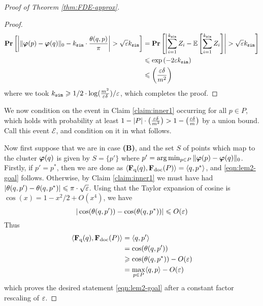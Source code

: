 \begin{proof}[Proof of Theorem \ref{thm:FDE-approx}]
\begin{proof}
\begin{equation}
    \begin{split}
        \operatorname{{\bf Pr}}\left[ \left| \|\boldsymbol{\varphi}(p) - \boldsymbol{\varphi}(q)\|_0 -  k_{\texttt{sim}} \cdot \frac{\theta(q,p)}{\pi} \right|  >  \sqrt{\varepsilon} k_{\texttt{sim}} \right] &=  \operatorname{{\bf Pr}}\left[ \left| \sum_{i=1}^{k_{\texttt{sim}}} Z_i -  \mathop{ \mathbb{E}\left[ \sum_{i=1}^{k_{\texttt{sim}}} Z_i \right]}\right|  >  \sqrt{\varepsilon} k_{\texttt{sim}} \right]  \\
        & \leqslant \exp\left(-2\varepsilon k_{\texttt{sim}}\right)\\
        & \leqslant    \left(\frac{\varepsilon\delta }{m^2}\right)
    \end{split}
\end{equation}
where we took $k_{\texttt{sim}} \geqslant 1/2 \cdot \log(\frac{m^2}{\varepsilon \delta})/\varepsilon$, which completes the proof.
\end{proof}
We now condition on the event in Claim \ref{claim:inner1} occurring for all $p \in P$, which holds with probability at least $1- |P|\cdot \left(\frac{\varepsilon\delta }{m^2}\right) > 1-  \left(\frac{\varepsilon\delta }{m}\right)$ by a union bound. Call this event $\mathcal{E}$, and condition on it in what follows.


Now first suppose that we are in case \textbf{(B)}, and the set $S$ of points which map to the cluster $\boldsymbol{\varphi}(q)$ is given by $S = \{p'\}$ where $p' = \arg \min_{p \in P} \|\boldsymbol{\varphi}(p) - \boldsymbol{\varphi}(q)\|_0$. Firstly, if $p' = p^*$, then we are done as $\langle \mathbf{F}_{\text{q}}(q) , \mathbf{F}_{\text{doc}}(P)\rangle = \langle q,p^*\rangle$,  and \ref{eqn:lem2-goal} follows. Otherwise, by Claim \ref{claim:inner1} we must have had $|\theta(q,p') - \theta(q,p^*)| \leqslant \pi \cdot \sqrt{\varepsilon}$. Using that the Taylor expansion of cosine is $\cos(x) = 1-x^2/2 + O(x^4)$, we have 
\[   |\cos(\theta(q,p')) - \cos (\theta(q,p^*))| \leqslant O(\varepsilon)\]
 Thus 
 \begin{equation}
     \begin{split}
         \langle \mathbf{F}_{\text{q}}(q) , \mathbf{F}_{\text{doc}}(P)\rangle &= \langle q,p'\rangle \\
         & = \cos(\theta(q,p')) \\
         & \geqslant \cos (\theta(q,p^*)) - O(\varepsilon) \\
         & =\max_{p \in P} \langle q,p\rangle   - O(\varepsilon) \\
     \end{split}
 \end{equation}
 which proves the desired statement \ref{eqn:lem2-goal} after a constant factor rescaling of $\varepsilon$.
 

\end{proof}
